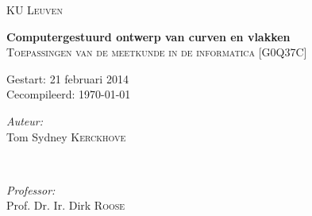 \begin{titlepage}
\thispagestyle{empty}
\newcommand{\HRule}{\rule{\linewidth}{0.5mm}}
\center
\textsc{\LARGE KU Leuven}\\[1.5cm]
\vfill


{ \Huge \bfseries Computergestuurd ontwerp van curven en vlakken}\\[0.4cm]
\textsc{\large Toepassingen van de meetkunde in de informatica [G0Q37C]}\\[0.5cm]

\vspace{5cm}

\begin{Large}
Gestart: 21 februari 2014\\
Cecompileerd: \today\\
\end{Large}
\vspace{5cm}

\begin{minipage}{0.4\textwidth}
\begin{flushleft} \large
\emph{Auteur:}\\
Tom Sydney \textsc{Kerckhove}
\end{flushleft}
\end{minipage}
~
\begin{minipage}{0.4\textwidth}
\begin{flushright} \large
\emph{Professor:} \\
Prof. Dr. Ir. Dirk \textsc{Roose}\\
\end{flushright}
\end{minipage}\\[4cm]

\vfill

\end{titlepage}